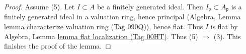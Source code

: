 \documentclass{amsart}
\theoremstyle{plain}
\theoremstyle{definition}
\theoremstyle{remark}
\numberwithin{equation}{subsection}
\begin{document}
\begin{proof}
\medskip\noindent
Assume (5). Let $I \subset A$ be a finitely generated ideal.
Then $I_\mathfrak p \subset A_\mathfrak p$ is a finitely generated ideal
in a valuation ring, hence principal
(Algebra, Lemma \href{https://stacks.math.columbia.edu/tag/090Q}{lemma characterize valuation ring (Tag 090Q)}), hence flat.
Thus $I$ is flat by
Algebra, Lemma \href{https://stacks.math.columbia.edu/tag/00HT}{lemma flat localization (Tag 00HT)}.
Thus (5) $\Rightarrow$ (3). This finishes the proof of the lemma.
\end{proof}
\end{document}
